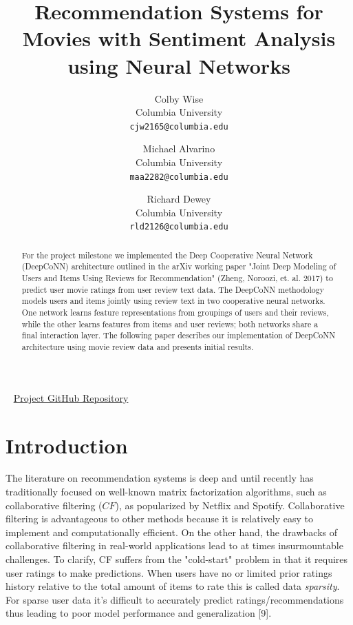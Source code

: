 \documentclass[10pt,twocolumn,letterpaper]{article}
\begin{document}
\title{Recommendation Systems for Movies with Sentiment Analysis using Neural Networks}

\author{Colby Wise\\
Columbia University\\
{\tt\small cjw2165@columbia.edu}
\and
Michael Alvarino\\
Columbia University\\
{\tt\small maa2282@columbia.edu}
\and
Richard Dewey\\
Columbia University\\
{\tt\small rld2126@columbia.edu}
}

\maketitle

\begin{abstract}
   For the project milestone we implemented the Deep Cooperative Neural Network (DeepCoNN) 
   architecture outlined in the arXiv working paper 
   "Joint Deep Modeling of Users and Items Using Reviews for Recommendation" 
   (Zheng, Noroozi, et. al. 2017) to predict user movie ratings from user review text data. 
   The DeepCoNN methodology models users and items jointly using review text in two cooperative neural networks.
   One network learns feature representations from groupings of users and their reviews, while the other learns
   features from items and user reviews; both networks share a final interaction layer. The following paper
   describes our implementation of DeepCoNN architecture using movie review data and presents 
   initial results.
\end{abstract}
\ \newline
\href{https://github.com/michaelAlvarino/Deep-Learning}{Project GitHub Repository}

\section{Introduction}

\par The literature on recommendation systems is deep and until recently has traditionally focused on well-known matrix factorization algorithms, such as collaborative filtering ($CF$), as popularized by Netflix and Spotify. Collaborative filtering is advantageous to other methods because it is relatively easy to implement and computationally efficient. On the other hand, the drawbacks of collaborative filtering in real-world applications lead to at times insurmountable challenges. To clarify, CF suffers from the "cold-start" problem in that it requires user ratings to make predictions. When users have no or limited prior ratings history relative to the total amount of items to rate this is called data \textit{sparsity}. For sparse user data it's difficult to accurately predict ratings/recommendations thus leading to poor model performance and generalization [9]. 
\end{document}
